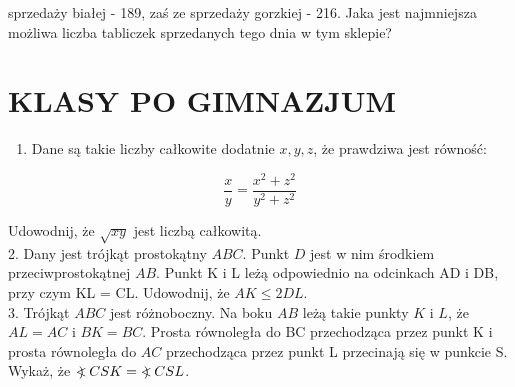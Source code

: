 \documentclass[10pt]{article}
\newcommand\Varangle{\mathop{{<\!\!\!\!\!\text{\small)}}\:}\nolimits}
\begin{document}
\begin{enumerate}
sprzedaży białej - 189, zaś ze sprzedaży gorzkiej - 216. Jaka jest najmniejsza możliwa liczba tabliczek sprzedanych tego dnia w tym sklepie?
\end{enumerate}

\section*{KLASY PO GIMNAZJUM}
\begin{enumerate}
  \item Dane są takie liczby całkowite dodatnie \(x, y, z\), że prawdziwa jest równość:
\end{enumerate}

\[
\frac{x}{y}=\frac{x^{2}+z^{2}}{y^{2}+z^{2}}
\]

Udowodnij, że \(\sqrt{x y}\) jest liczbą całkowitą.\\
2. Dany jest trójkąt prostokątny \(A B C\). Punkt \(D\) jest w nim środkiem przeciwprostokątnej \(A B\). Punkt K i L leżą odpowiednio na odcinkach AD i DB, przy czym KL = CL. Udowodnij, że \(A K \leq 2 D L\).\\
3. Trójkąt \(A B C\) jest różnoboczny. Na boku \(A B\) leżą takie punkty \(K\) i \(L\), że \(A L=A C\) i \(B K=B C\). Prosta równoległa do BC przechodząca przez punkt K i prosta równoległa do \(A C\) przechodząca przez punkt L przecinają się w punkcie S. Wykaż, że \(\Varangle C S K=\Varangle C S L\).
\end{document}
